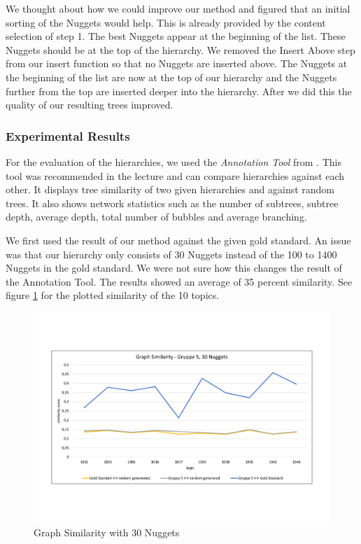 We thought about how we could improve our method and figured that an initial sorting of the Nuggets would help. This is already provided by the content selection of step 1. The best Nuggets appear at the beginning of the list. These Nuggets should be at the top of the hierarchy. We removed the Insert Above step from our insert function so that no Nuggets are inserted above. The Nuggets at the beginning of the list are now at the top of our hierarchy and the Nuggets further from the top are inserted deeper into the hierarchy. After we did this the quality of our resulting trees improved.

\subsubsection{Experimental Results}

For the evaluation of the hierarchies, we used the \textit{Annotation Tool} from \cite{Tauchmann.et.al.2018.LREC}. This tool was recommended in the lecture and can compare hierarchies against each other. It displays tree similarity of two given hierarchies and against random trees. It also shows network statistics such as the number of subtrees, subtree depth, average depth, total number of bubbles and average branching.

We first used the result of our method against the given gold standard. An issue was that our hierarchy only consists of 30 Nuggets instead of the 100 to 1400 Nuggets in the gold standard. We were not sure how this changes the result of the Annotation Tool. The results showed an average of 35 percent similarity. See figure \ref{fig:graph30} for the plotted similarity of the 10 topics.

\begin{figure}[H]
	\centering
	\includegraphics[trim= 0 130 0 130,width=\textwidth]{img/sim_v1.pdf}
	\caption{Graph Similarity with 30 Nuggets}
	\label{fig:graph30}
\end{figure}

